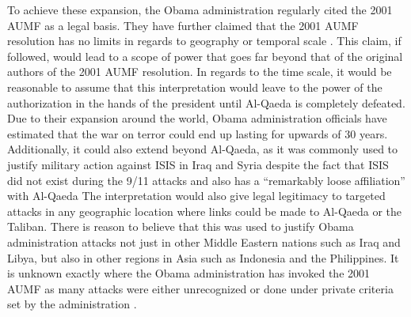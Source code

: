 \documentclass[12pt]{article}
\begin{document}
To achieve these expansion, the Obama administration regularly cited the 2001 AUMF as a legal basis.
They have further claimed that the 2001 AUMF resolution has no limits in regards to geography or temporal scale \autocite[108]{boyle2015}.
This claim, if followed, would lead to a scope of power that goes far beyond that of the original authors of the 2001 AUMF resolution.
In regards to the time scale, it would be reasonable to assume that this interpretation would leave to the power of the authorization in the hands of the president until Al-Qaeda is completely defeated.
Due to their expansion around the world, Obama administration officials have estimated that the war on terror could end up lasting for upwards of 30 years.
Additionally, it could also extend beyond Al-Qaeda, as it was commonly used to justify military action against ISIS in Iraq and Syria despite the fact that ISIS did not exist during the 9/11 attacks and also has a ``remarkably loose affiliation'' with Al-Qaeda \autocite[111]{boyle2015}
The interpretation would also give legal legitimacy to targeted attacks in any geographic location where links could be made to Al-Qaeda or the Taliban.
There is reason to believe that this was used to justify Obama administration attacks not just in other Middle Eastern nations such as Iraq and Libya, but also in other regions in Asia such as Indonesia and the Philippines.
It is unknown exactly where the Obama administration has invoked the 2001 AUMF as many attacks were either unrecognized or done under private criteria set by the administration \autocite[109]{boyle2015}.
\end{document}
